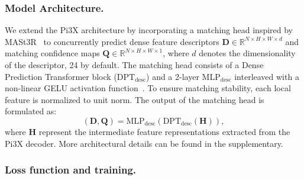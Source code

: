 \subsubsection{Model Architecture.} 
We extend the Pi3X architecture by incorporating a matching head inspired by MASt3R~\cite{leroy2024grounding} to concurrently predict dense feature descriptors $\mathbf{D} \in \mathbb{R}^{N \times H \times W \times d}$ and matching confidence maps $\mathbf{Q} \in \mathbb{R}^{N \times H \times W \times 1}$, where $d$ denotes the dimensionality of the descriptor, 24 by default.
The matching head consists of a Dense Prediction Transformer block ($\mathrm{DPT_{desc}}$) and a 2-layer $\mathrm{MLP_{desc}}$ interleaved with a non-linear GELU activation function~\cite{hendrycks2016gaussian}. To ensure matching stability, each local feature is normalized to unit norm. The output of the matching head is formulated as:
\begin{equation}
(\mathbf{D}, \mathbf{Q}) = \mathrm{MLP_{desc}}(\mathrm{DPT_{desc}}(\mathbf{H})),
\end{equation}
where $\mathbf{H}$ represent the intermediate feature representations extracted from the Pi3X decoder. More architectural details can be found in the supplementary.

\subsubsection{Loss function and training.}

